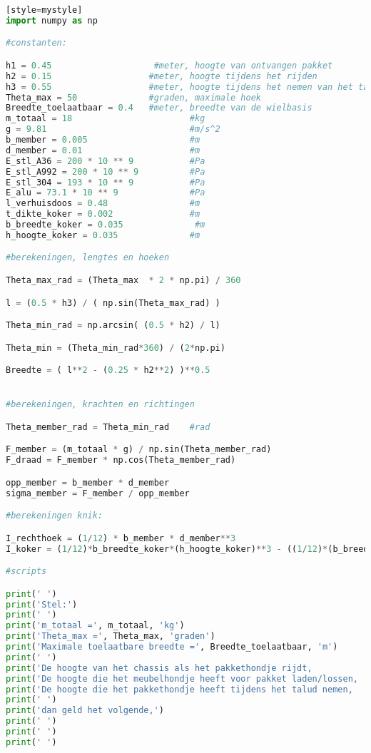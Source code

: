 \begin{lstlisting}[language=Python][style=mystyle]
import numpy as np

#constanten:

h1 = 0.45                    #meter, hoogte van ontvangen pakket
h2 = 0.15                   #meter, hoogte tijdens het rijden
h3 = 0.55                   #meter, hoogte tijdens het nemen van het talud
Theta_max = 50              #graden, maximale hoek
Breedte_toelaatbaar = 0.4   #meter, breedte van de wielbasis
m_totaal = 18                       #kg
g = 9.81                            #m/s^2
b_member = 0.005                    #m
d_member = 0.01                     #m
E_stl_A36 = 200 * 10 ** 9           #Pa
E_stl_A992 = 200 * 10 ** 9          #Pa
E_stl_304 = 193 * 10 ** 9           #Pa
E_alu = 73.1 * 10 ** 9              #Pa
l_verhuisdoos = 0.48                #m
t_dikte_koker = 0.002               #m
b_breedte_koker = 0.035              #m
h_hoogte_koker = 0.035              #m

#berekeningen, lengtes en hoeken

Theta_max_rad = (Theta_max  * 2 * np.pi) / 360

l = (0.5 * h3) / ( np.sin(Theta_max_rad) )

Theta_min_rad = np.arcsin( (0.5 * h2) / l)

Theta_min = (Theta_min_rad*360) / (2*np.pi)

Breedte = ( l**2 - (0.25 * h2**2) )**0.5


#berekeningen, krachten en richtingen

Theta_member_rad = Theta_min_rad    #rad

F_member = (m_totaal * g) / np.sin(Theta_member_rad)
F_draad = F_member * np.cos(Theta_member_rad)

opp_member = b_member * d_member
sigma_member = F_member / opp_member

#berekeningen knik:

I_rechthoek = (1/12) * b_member * d_member**3
I_koker = (1/12)*b_breedte_koker*(h_hoogte_koker)**3 - ((1/12)*(b_breedte_koker-2*t_dikte_koker)*(h_hoogte_koker-2*t_dikte_koker)**3)

#scripts

print(' ')
print('Stel:')
print(' ')
print('m_totaal =', m_totaal, 'kg')
print('Theta_max =', Theta_max, 'graden')
print('Maximale toelaatbare breedte =', Breedte_toelaatbaar, 'm')
print(' ')
print('De hoogte van het chassis als het pakkethondje rijdt,            h2, is:', h2, 'm')
print('De hoogte die het meubelhondje heeft voor pakket laden/lossen,       h1, is:', h1, 'm')
print('De hoogte die het pakkethondje heeft tijdens het talud nemen,        h3, is:', h3, 'm')
print(' ')
print('dan geld het volgende,')
print(' ')
print(' ')
print(' ')


\end{lstlisting}
